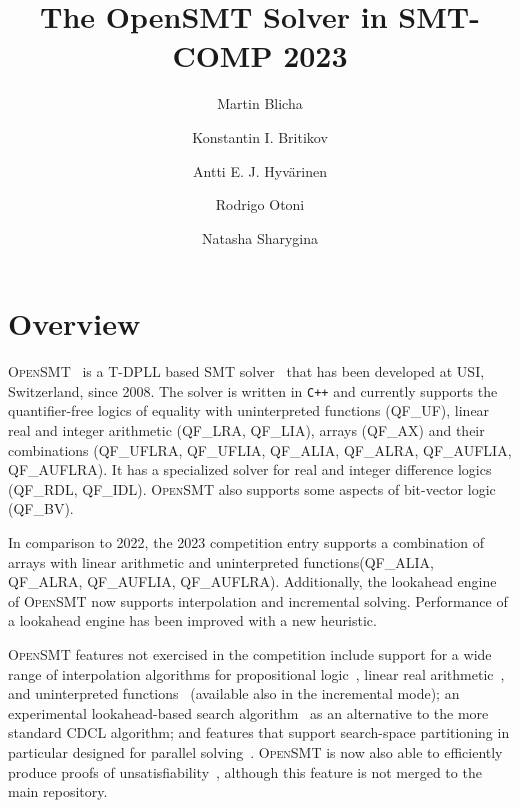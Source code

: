 \documentclass{easychair}
\title{The OpenSMT Solver in SMT-COMP 2023}
\author{
Martin Blicha\inst{1,3} \and
Konstantin I. Britikov\inst{1} \and
Antti E. J. Hyv{\"a}rinen\inst{2} \and
Rodrigo Otoni\inst{1} \and 
Natasha Sharygina\inst{1} \\
}
\institute{Universit{\`a} della Svizzera italiana (USI), Lugano,
Switzerland \and Certora, Isreal \and Charles University, Prague, Czech Republic}
\date{}
\newcommand{\qflra}{QF\_LRA}
\newcommand{\qflia}{QF\_LIA}
\newcommand{\qfuf}{QF\_UF}
\newcommand{\qfbv}{QF\_BV}
\newcommand{\qfrdl}{QF\_RDL}
\newcommand{\qfidl}{QF\_IDL}
\newcommand{\qfuflra}{QF\_UFLRA}
\newcommand{\qfuflia}{QF\_UFLIA}
\newcommand{\qfax}{QF\_AX}
\newcommand{\qfauflia}{QF\_AUFLIA}
\newcommand{\qfauflra}{QF\_AUFLRA}
\newcommand{\qfalia}{QF\_ALIA}
\newcommand{\qfalra}{QF\_ALRA}
\newcommand{\opensmt}{\textsc{OpenSMT}\xspace}
\begin{document}
\maketitle

\section{Overview}

\opensmt~\cite{HyvarinenMAS16} is a T-DPLL based SMT
solver~\cite{NieuwenhuisOT:JACM06} that has been developed at USI,
Switzerland, since 2008.  The solver is written in {\tt C++} and
currently supports the quantifier-free logics of equality with
uninterpreted functions (\qfuf), linear real and integer arithmetic
(\qflra, \qflia), arrays (\qfax) and their combinations (\qfuflra, \qfuflia, \qfalia, \qfalra, \qfauflia, \qfauflra).
It has a specialized solver for real and integer difference logics (\qfrdl,
\qfidl). \opensmt also supports some aspects of bit-vector logic (\qfbv).

In comparison to 2022, the 2023 competition entry supports a combination of arrays with linear arithmetic and uninterpreted functions(\qfalia, \qfalra, \qfauflia, \qfauflra). 
Additionally, the lookahead engine of \opensmt now supports interpolation and incremental solving.
Performance of a lookahead engine has been improved with a new heuristic.

\opensmt features not exercised in the competition include support for a
wide range of interpolation algorithms for propositional
logic~\cite{AltFHS:VSTTE2015}, linear real
arithmetic~\cite{BlichaHKS19}, and uninterpreted
functions~\cite{AltHAS:FMCAD17} (available also in the incremental
mode); an experimental look\-ahead-based search
algorithm~\cite{HyvarinenMSCS18} as an alternative to the more standard
CDCL algorithm; and features that support search-space partitioning in
particular designed for parallel solving~\cite{HyvarinenMS:SAT15}.
\opensmt is now also able to efficiently produce proofs of
unsatisfiability~\cite{OtoniBEHS:DAC21}, although this feature is not merged to the main repository.

\iffalse %
\end{document}
